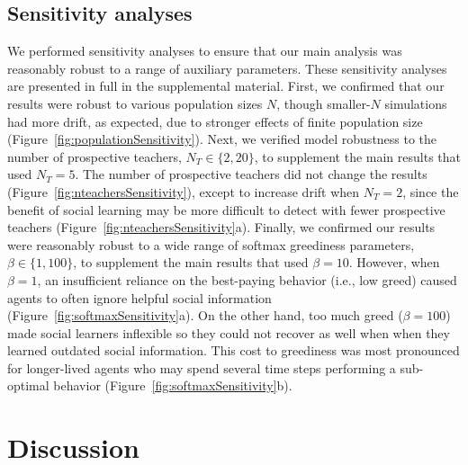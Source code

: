 \documentclass[letterpaper,11.5pt]{scrartcl}
\begin{document}
\subsection{Sensitivity analyses}

We performed sensitivity analyses to ensure that our main analysis was reasonably
robust to a range of auxiliary parameters. These sensitivity analyses are presented in full in the supplemental material. First, we confirmed that our results were robust to various population sizes $N$, though smaller-$N$ simulations had more drift, as expected, due to stronger effects of finite population size (Figure~\ref{fig:populationSensitivity}). %
Next, we verified model robustness to the number of prospective teachers, $N_T \in \{2, 20\}$, to supplement the main results that used $N_T = 5$. The number of prospective teachers did not change the results (Figure~\ref{fig:nteachersSensitivity}), except to increase drift when $N_T = 2$, since the benefit of social learning may be more difficult to detect with fewer prospective teachers (Figure~\ref{fig:nteachersSensitivity}a). Finally, we confirmed our results were reasonably robust to a wide range of softmax greediness parameters, $\beta \in \{1, 100\}$, to supplement the main results that used $\beta = 10$. However, when $\beta = 1$, an insufficient reliance on the best-paying behavior (i.e., low greed) caused agents to often ignore helpful social information  (Figure~\ref{fig:softmaxSensitivity}a). On the other hand, too much greed ($\beta=100$) made social learners inflexible so they could not recover as well when when they learned outdated social information. This cost to greediness was most pronounced for longer-lived agents who may spend several time steps performing a sub-optimal behavior (Figure~\ref{fig:softmaxSensitivity}b).

\section{Discussion}
\end{document}
